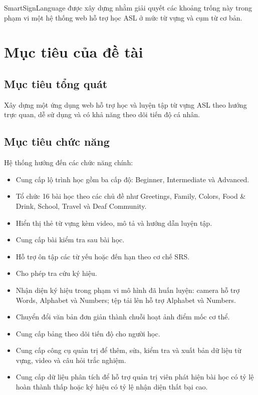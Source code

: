 SmartSignLanguage được xây dựng nhằm giải quyết các khoảng trống này trong
phạm vi một hệ thống web hỗ trợ học ASL ở mức từ vựng và cụm từ cơ bản.

\section{Mục tiêu của đề tài}

\subsection{Mục tiêu tổng quát}

Xây dựng một ứng dụng web hỗ trợ học và luyện tập từ vựng ASL theo hướng trực
quan, dễ sử dụng và có khả năng theo dõi tiến độ cá nhân.

\subsection{Mục tiêu chức năng}

Hệ thống hướng đến các chức năng chính:

\begin{itemize}
  \item Cung cấp lộ trình học gồm ba cấp độ: Beginner, Intermediate và Advanced.
  \item Tổ chức 16 bài học theo các chủ đề như Greetings, Family, Colors, Food
        \& Drink, School, Travel và Deaf Community.
  \item Hiển thị thẻ từ vựng kèm video, mô tả và hướng dẫn luyện tập.
  \item Cung cấp bài kiểm tra sau bài học.
  \item Hỗ trợ ôn tập các từ yếu hoặc đến hạn theo cơ chế SRS.
  \item Cho phép tra cứu ký hiệu.
  \item Nhận diện ký hiệu trong phạm vi mô hình đã huấn luyện: camera hỗ trợ
        Words, Alphabet và Numbers; tệp tải lên hỗ trợ Alphabet và Numbers.
  \item Chuyển đổi văn bản đơn giản thành chuỗi hoạt ảnh điểm mốc cơ thể.
  \item Cung cấp bảng theo dõi tiến độ cho người học.
  \item Cung cấp công cụ quản trị để thêm, sửa, kiểm tra và xuất bản dữ liệu từ
        vựng, video và câu hỏi trắc nghiệm.
  \item Cung cấp dữ liệu phân tích để hỗ trợ quản trị viên phát hiện bài học có
        tỷ lệ hoàn thành thấp hoặc ký hiệu có tỷ lệ nhận diện thất bại cao.
\end{itemize}

